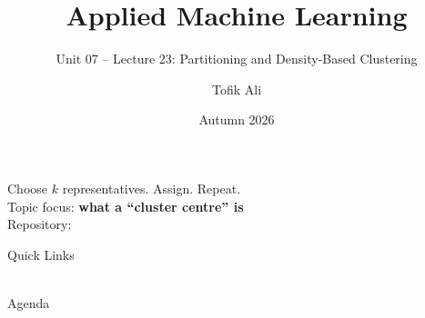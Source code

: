 \documentclass[aspectratio=169]{beamer}
\title[Applied Machine Learning]{Applied Machine Learning}
\subtitle{Unit 07 -- Lecture 23: Partitioning and Density-Based Clustering}
\author{Tofik Ali}
\institute{School of Computer Science, UPES Dehradun}
\date{Autumn 2026}
\begin{document}
\UPESCoverFrame
\setcounter{framenumber}{0}

\begin{frame}[shrink=5]
  \titlepage
  \begin{center}
    \footnotesize Choose $k$ representatives. Assign. Repeat.\\[0.25em]
    \footnotesize Topic focus: \textbf{what a ``cluster centre'' is}\\[0.25em]
    \footnotesize Repository: \texttt{\AMLRepoURL}
  \end{center}
  \slidesources{\AMLUnitVIISources}
\end{frame}

\begin{frame}{Quick Links}
  \centering
  \hyperlink{sec:part}{}\hspace{0.4em}
  \hyperlink{sec:hand}{}\hspace{0.4em}
  \hyperlink{sec:conv}{}\hspace{0.4em}
  \hyperlink{sec:k}{}\\[0.6em]
  \hyperlink{sec:assume}{}\hspace{0.4em}
  \hyperlink{sec:medoid}{}\hspace{0.4em}
  \hyperlink{sec:clara}{}\\[0.6em]
  \hyperlink{sec:dbscan}{}\hspace{0.4em}
  \hyperlink{sec:eps}{}\hspace{0.4em}
  \hyperlink{sec:summary}{}
\end{frame}

\begin{frame}{Agenda}
  \tableofcontents
\end{frame}
\end{document}

